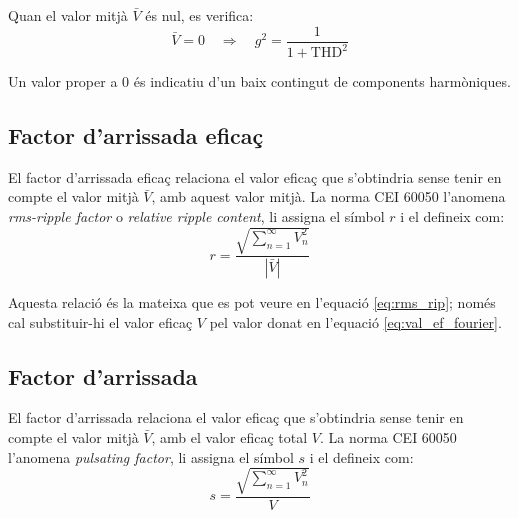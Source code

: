 Quan el valor mitjà $\bar{V}$ és nul, es verifica:
\begin{equation}
   \bar{V}=0 \quad \Rightarrow\quad g^2 = \frac{1}{1+\text{THD}^2}
\end{equation}

Un valor proper a 0 és indicatiu d'un baix contingut de components harmòniques.

\subsection{Factor d'arrissada eficaç}\label{sec:four_fac_arr_ef}

El factor d'arrissada eficaç relaciona el valor eficaç  que
s'obtindria sense tenir en compte el valor mitjà  $\bar{V}$, amb aquest
valor mitjà. La norma CEI 60050 l'anomena \textit{rms-ripple factor} o \textit{relative ripple content}, li assigna el símbol $r$ i el defineix com:
\begin{equation}
    r = \frac{\sqrt{\displaystyle\sum_{n=1}^\infty V^2_n}}{|\bar{V}|}
\end{equation}

Aquesta relació és la mateixa que es pot veure en l'equació  \eqref{eq:rms_rip}; només cal substituir-hi el valor eficaç $V$ pel valor donat en l'equació \eqref{eq:val_ef_fourier}.

\subsection{Factor d'arrissada}

El factor d'arrissada relaciona el valor eficaç  que
s'obtindria sense tenir en compte el valor mitjà  $\bar{V}$, amb el
valor eficaç total $V$. La norma CEI 60050 l'anomena \textit{pulsating factor}, li assigna el símbol $s$ i el defineix com:
\begin{equation}
    s = \frac{\sqrt{\displaystyle\sum_{n=1}^\infty V^2_n}}{V}
\end{equation}

